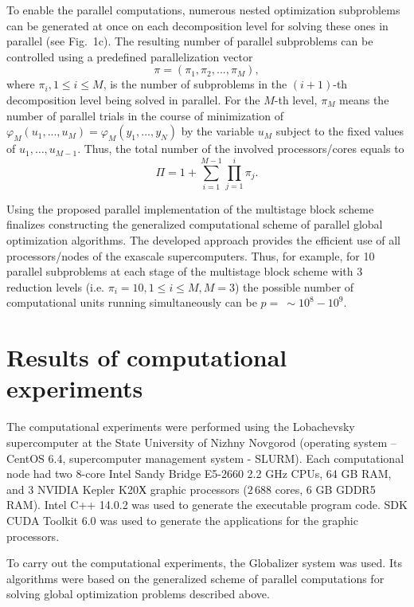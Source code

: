 \documentclass[12pt]{amsart}
\begin{document}
To enable the parallel computations, numerous nested optimization subproblems can be generated at once on each decomposition level for solving these ones in parallel \cite{Sergeyev7} (see Fig.~1c). The resulting number of parallel subproblems can be controlled using a predefined parallelization vector
\begin{equation}
\pi = (\pi_1, \pi_2, ..., \pi_M),
\end{equation}
where $\pi_i, 1 \leq i \leq M$, is the number of subproblems in the $(i+1)$-th decomposition level being solved in parallel. For the $M$-th level, $\pi_M$ means the number of parallel trials in the course of minimization of $\varphi_M(u_1,...,u_M) = \varphi_M(y_1,...,y_N)$ by the variable $u_M$  subject to the fixed values of $u_1, \dots, u_{M-1}$. Thus, the total number of the involved processors/cores equals to
\begin{equation}
\Pi = 1 + \sum_{i=1}^{M-1} \prod_{j=1}^i \pi_j.
\end{equation}

Using the proposed parallel implementation of the multistage block scheme finalizes constructing the generalized computational scheme of parallel global optimization algorithms. The developed approach provides the efficient use of all processors/nodes of the exascale supercomputers. Thus, for example, for 10 parallel subproblems at each stage of the multistage block scheme with 3 reduction levels (i.e. $\pi_i = 10, 1 \leq i \leq M, M = 3$) the possible number of computational units running simultaneously can be $p = \ \sim10^8-10^9$. 

\section{Results of computational experiments}

The computational experiments were performed using the Lobachevsky supercomputer at the State University of Nizhny Novgorod (operating system -- CentOS 6.4, supercomputer management system - SLURM). Each computational node had two 8-core Intel Sandy Bridge E5-2660 2.2 GHz CPUs, 64 GB RAM, and 3 NVIDIA Kepler K20Х graphic processors ($2\,688$ cores, 6 GB GDDR5 RAM). Intel C++ 14.0.2 was used to generate the executable program code. SDK CUDA Toolkit 6.0 was used to generate the applications for the graphic processors.

To carry out the computational experiments, the Globalizer system \cite{Sysoyev} was used. Its algorithms were based on the generalized scheme of parallel computations for solving global optimization problems described above.
 
\end{document}
